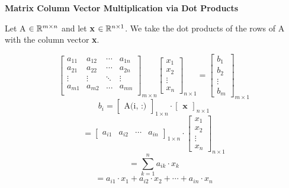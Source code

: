 \documentclass[12pt]{article}
\begin{document}
\begin{defin}{\textbf{Matrix Column Vector Multiplication via Dot Products}}
    
    Let A $\in \mathbb{R}^{m \times n}$ and let \textbf{x} $\in \mathbb{R}^{n \times 1}$. We take the dot products of the rows of A with the column vector \textbf{x}.

    \[
    \begin{bmatrix}
        a_{11} & a_{12} & \cdots & a_{1n} \\
        a_{21} & a_{22} & \cdots & a_{2n} \\
        \vdots & \vdots & \ddots & \vdots \\
        a_{m1} & a_{m2} & ... & a_{mn} \\
    \end{bmatrix}_{m \times n}
    \begin{bmatrix}
        x_1 \\
        x_2 \\
        \vdots \\
        x_n
    \end{bmatrix}_{n \times 1} = 
    \begin{bmatrix}
        b_1 \\
        b_2 \\
        \vdots \\
        b_m
    \end{bmatrix}_{m \times 1}
    \]
    \[
    b_i = 
    \begin{bmatrix}\text{A(i, :)}\end{bmatrix}_{1 \times n}
    \cdot 
    \begin{bmatrix}\textbf{x}\end{bmatrix}_{n \times 1}
    \]
    \[
    =
    \begin{bmatrix}
        a_{i1} & a_{i2} & \cdots & a_{in}
    \end{bmatrix}_{1 \times n}
    \cdot
    \begin{bmatrix}
        x_{1} \\ x_2 \\ \vdots \\ x_n
    \end{bmatrix}_{n \times 1}
    \]
    \[
    = \sum_{k=1}^{n}a_{ik} \cdot x_k
    \]
    \[
    = a_{i1} \cdot x_1 + a_{i2} \cdot x_2 + \cdots + a_{in} \cdot x_n
    \]
\end{defin}
\end{document}

